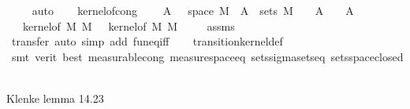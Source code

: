\begin{isabellebody}
\ \ \ \isamarkupfalse%
\ auto\isanewline
\ \ \isamarkupfalse%
%
\endisatagproof
{\isafoldproof}%
%
\isadelimproof
\isanewline
%
\endisadelimproof
\isanewline
{}\isamarkupfalse%
\ kernel{\isacharunderscore}{\kern0pt}of{\isacharunderscore}{\kern0pt}cong{\isacharcolon}{\kern0pt}\isanewline
\ \ \ {\isachardoublequoteopen}{\isasymAnd}{\isasymomega}\ A{\isacharprime}{\kern0pt}{\isachardot}{\kern0pt}\ {\isasymomega}\ {\isasymin}\ space\ M\ {\isasymand}\ A{\isacharprime}{\kern0pt}\ {\isasymin}\ sets\ M{\isacharprime}{\kern0pt}\ {\isasymLongrightarrow}\ {\isasymkappa}\ {\isasymomega}\ A{\isacharprime}{\kern0pt}\ {\isacharequal}{\kern0pt}\ {\isasymkappa}{\isacharprime}{\kern0pt}\ {\isasymomega}\ A{\isacharprime}{\kern0pt}{\isachardoublequoteclose}\isanewline
\ \ \ {\isachardoublequoteopen}kernel{\isacharunderscore}{\kern0pt}of\ M\ M{\isacharprime}{\kern0pt}\ {\isasymkappa}\ {\isacharequal}{\kern0pt}\ kernel{\isacharunderscore}{\kern0pt}of\ M\ M{\isacharprime}{\kern0pt}\ {\isasymkappa}{\isacharprime}{\kern0pt}{\isachardoublequoteclose}\isanewline
%
\isadelimproof
\ \ %
\endisadelimproof
%
\isatagproof
{}\isamarkupfalse%
\ assms\ \isamarkupfalse%
\ {\isacharparenleft}{\kern0pt}transfer{\isacharcomma}{\kern0pt}\ auto\ simp\ add{\isacharcolon}{\kern0pt}\ fun{\isacharunderscore}{\kern0pt}eq{\isacharunderscore}{\kern0pt}iff{\isacharparenright}{\kern0pt}\isanewline
\ \ \isamarkupfalse%
\ transition{\isacharunderscore}{\kern0pt}kernel{\isacharunderscore}{\kern0pt}def\isanewline
\ \ \ \isamarkupfalse%
\ {\isacharparenleft}{\kern0pt}smt\ {\isacharparenleft}{\kern0pt}verit{\isacharcomma}{\kern0pt}\ best{\isacharparenright}{\kern0pt}\ measurable{\isacharunderscore}{\kern0pt}cong\ measure{\isacharunderscore}{\kern0pt}space{\isacharunderscore}{\kern0pt}eq\ sets{\isachardot}{\kern0pt}sigma{\isacharunderscore}{\kern0pt}sets{\isacharunderscore}{\kern0pt}eq\ sets{\isachardot}{\kern0pt}space{\isacharunderscore}{\kern0pt}closed{\isacharparenright}{\kern0pt}{\isacharplus}{\kern0pt}\isanewline
\ \ \isamarkupfalse%
%
\endisatagproof
{\isafoldproof}%
%
\isadelimproof
%
\endisadelimproof
%
\begin{isamarkuptext}%
Klenke lemma 14.23%
\end{isamarkuptext}\isamarkuptrue%
%
\end{isabellebody}

